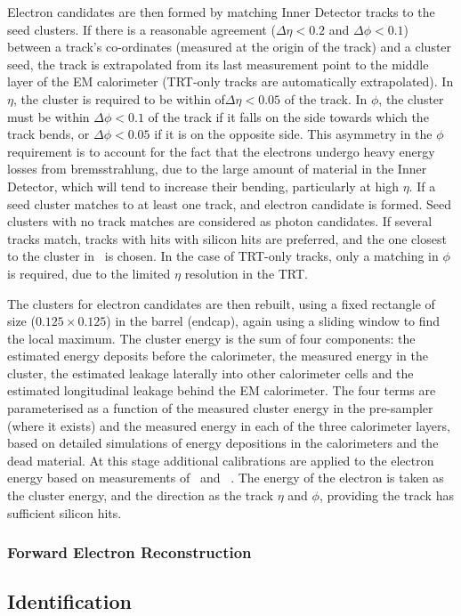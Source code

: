 Electron candidates are then formed by matching Inner Detector tracks to the
seed clusters. If there is a reasonable agreement ($\Delta \eta <0.2$ and
$\Delta \phi <0.1$) between a track's co-ordinates (measured at the origin of the
track) and a cluster seed, the track is extrapolated from its last measurement point to
the middle layer of the EM calorimeter (TRT-only tracks are automatically
extrapolated). In $\eta$, the cluster is required to be within 
of$\Delta \eta <0.05$ of the track. In $\phi$, the cluster must be within $\Delta \phi < 0.1$ of
the track if it falls on the side towards which the track bends, or $\Delta
\phi < 0.05$ if it is on the opposite side. This asymmetry in the $\phi$
requirement is to
account for the fact that the electrons undergo heavy energy losses from
bremsstrahlung, due to the large amount of material in the Inner Detector, which
will tend to increase their bending,
particularly at high $\eta$. If a seed cluster matches to at least one track,
and electron candidate is formed. Seed clusters with no track matches are
considered as photon candidates. If several tracks match, tracks with hits with
silicon hits are preferred, and the one closest to the cluster in \deltaR\ 
is chosen. In the case of TRT-only tracks, only a matching in $\phi$ is required, 
due to the limited $\eta$ resolution in the TRT.

The clusters for electron candidates are then rebuilt, using a fixed rectangle of size 
\deltaetadeltaphi{0.075}{0.175} ($0.125 \times 0.125$) in the barrel (endcap),
again using a sliding window to find the local maximum. The cluster energy is
the sum of four components: the estimated energy deposits before the
calorimeter, the measured energy in the cluster, the estimated leakage laterally
into other calorimeter cells and the estimated longitudinal leakage behind the
EM calorimeter. The four terms are parameterised as a function of the measured
cluster energy in the pre-sampler (where it exists) and the measured energy in each of the three
calorimeter layers, based on detailed simulations of energy depositions in the
calorimeters and the dead material. At this stage additional calibrations are
applied to the electron energy based on measurements of \Zee\ and
\JPsiee~\cite{Aad:2011mk}. The energy of the electron is taken as the cluster
energy, and the direction as the track $\eta$ and $\phi$, providing the track
has sufficient silicon hits.

\subsubsection{Forward Electron Reconstruction}

\subsection{Identification}

